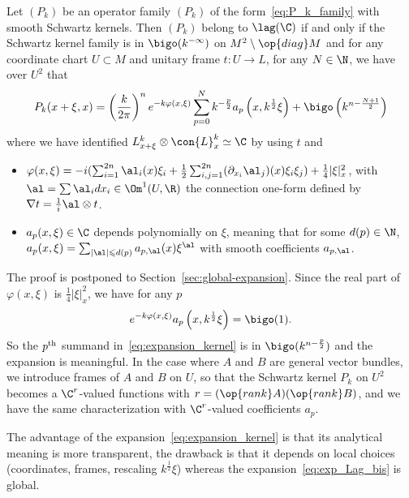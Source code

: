 \begin{prop}\label{prop:un_de_plus}
Let $(P_k)$ be an operator family $(P_k)$ of the form~\eqref{eq:P_k_family} with smooth Schwartz kernels. Then $(P_k)$ belong to $\lag (\C)$ if and only if the Schwartz kernel family is in $\bigo (k^{-\infty})$ on $M^2
\setminus \op{diag} M$ and for any coordinate chart $U \subset M$ and unitary frame $t : U \rightarrow L$, for any $N \in \N$, we have over $U^2$ that
\begin{gather}\label{eq:expansion_kernel}
P_k (x + \xi, x) = \left(\frac{k}{2\pi} \right)^n e^{- k\varphi (x, \xi) }
\sum_{p =0 }^{N} k^{- \frac{p}{2}} a_{p} \left(x, k^{\frac{1}{2}} \xi \right) + \bigo \left(k^{n - \frac{N+1}{2}} \right)
\end{gather}
where we have identified $L_{x+\xi}^k \otimes \con{L}_{x}^k \simeq \C$ by using $t$ and
\begin{itemize}
\item[-] $\varphi(x, \xi) = - i (\sum_{i=1}^{2n} \al_i (x)\xi_i + \frac{1}{2}\sum_{i,j=1}^{2n} (\partial_{x_i}\al_j)(x) \xi_i \xi_j) + \frac{1}{4} |\xi|_x^2 $, with $\al =
\sum \al_i dx_i \linebreak\in \Om^1 (U, \R)$ the connection one-form defined by $\nabla t = \frac{1}{i} \al \otimes t$.
\item[-] $a_{p} (x,\xi) \in \C$ depends polynomially on $\xi$, meaning that for some $d(p) \in \N$, $a_p (x,\xi) =
\sum_{|\al |\leqslant d(p)} a_{p,\al} (x) \xi^\al$ with smooth coefficients $a_{p, \al}$.
\end{itemize}
\end{prop}

The proof is postponed to Section~\ref{sec:global-expansion}. Since the real part of $\varphi (x,\xi)$ is $\frac{1}{4} |\xi|_x^2$, we have for any $p$
\[
e^{-k \varphi (x, \xi)} a_p \left(x, k^\frac{1}{2} \xi \right) = \bigo
(1).
\]
So the $p^{\rm th}$ summand in~\eqref{eq:expansion_kernel} is in $\bigo (k^{n -\frac{p}{2}})$ and the expansion is meaningful. In the case where $A$ and $B$ are general vector bundles, we introduce frames of $A$ and $B$ on $U$, so that the Schwartz kernel $P_k$ on $U^2$ becomes a $\C^r$-valued functions with $r =(\op{rank} A)(\op{rank} B)$, and we have the same characterization with $\C^r$-valued coefficients $a_p$.


The advantage of the expansion~\eqref{eq:expansion_kernel} is that its analytical meaning is more transparent, the drawback is that it depends on local choices (coordinates, frames, rescaling $k^{\frac{1}{2}} \xi$) whereas the expansion~\eqref{eq:exp_Lag_bis} is global.


